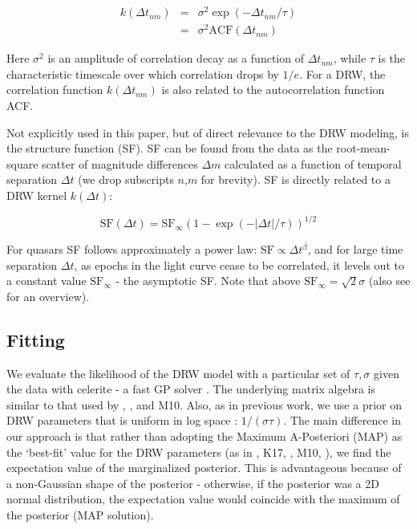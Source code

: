 \documentclass[twocolumn]{aastex62}
\newcommand{\project}[1]{\textsf{#1}}
\begin{document}
\begin{eqnarray}
k(\Delta t_{nm}) &=& \sigma^{2}\exp{(-\Delta t_{nm} / \tau)}  \nonumber \\
                 &=& \sigma^{2} \mathrm{ACF}(\Delta t_{nm})\nonumber
\end{eqnarray} 

Here $\sigma^{2}$ is an amplitude of correlation decay as a function of $\Delta t_{nm}$,  while $\tau$ is the characteristic timescale over which correlation drops by $1/e$. For a DRW,  the correlation function $k(\Delta t_{nm})$ is also related to the autocorrelation function ACF. 

Not explicitly used in this paper, but of direct relevance to the DRW modeling, is the structure function (SF). SF can be found from the data as the root-mean-square scatter of  magnitude differences $\Delta m$  calculated as a function of temporal separation $\Delta t$ (we drop subscripts $n$,$m$ for brevity). SF is directly related to a DRW kernel $k(\Delta t)$:

\begin{equation}
\mathrm{SF}(\Delta t) = \mathrm{SF}_{\infty} (1-\exp{(-|\Delta t|/\tau)})^{1/2}
\end{equation}

For quasars SF follows approximately a power law: $\mathrm{SF} \propto \Delta t^{\beta}$,  and for large time separation $\Delta t$, as epochs in the light curve cease to be correlated, it levels out to a constant value $\mathrm{SF}_{\infty}$ - the asymptotic SF.  Note that above $\mathrm{SF}_\infty = \sqrt{2} \sigma$ (also see \citet{macleod2012, bauer2009, graham2015a} for an overview).


\subsection{Fitting}
We evaluate the likelihood of the DRW model with a particular set of $\tau,\sigma$ given the data with \project{celerite}  - a fast GP solver \citep{foreman2017}. The underlying matrix algebra is similar to that used by \cite{rybicki1992}, \cite{kozlowski2010}, and M10. Also, as in previous work, we use a prior on DRW parameters that is  uniform  in log space :  $1 / (\sigma \tau)$. The main difference in our approach is that rather than adopting the Maximum A-Posteriori (MAP) as the `best-fit' value for the DRW parameters (as in \citealt{kozlowski2010}, K17, \citealt{kozlowski2016b}, M10, \citealt{macleod2011}),  we find the expectation value of the marginalized posterior. This is advantageous because of a non-Gaussian shape of the posterior - otherwise, if the posterior was a 2D normal distribution, the expectation value would coincide with the maximum of the posterior (MAP solution). 
\end{document}
